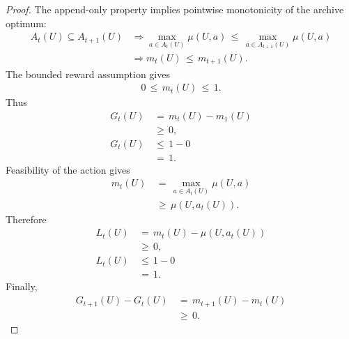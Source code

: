 \documentclass{article} %
\begin{document}
\begin{proof}
The append-only property implies pointwise monotonicity of the archive optimum:
\begin{align}
\label{eq:app-six-proof-m-monotone}
A_t(U)\subseteq A_{t+1}(U)
&\Longrightarrow
\max_{a\in A_t(U)}\mu(U,a)
\,\le\,
\max_{a\in A_{t+1}(U)}\mu(U,a)
\\
&\Longrightarrow
m_t(U)\,\le\, m_{t+1}(U).
\end{align}
The bounded reward assumption gives
\begin{align}
\label{eq:app-six-proof-m-bounded}
0
\,\le\,
m_t(U)
\,\le\,
1.
\end{align}
Thus
\begin{align}
\label{eq:app-six-proof-G-bound}
G_t(U)
&\,=\,
m_t(U)-m_1(U)
\\
&\,\ge\,
0,
\\
G_t(U)
&\,\le\,
1-0
\\
&\,=\,
1.
\end{align}
Feasibility of the action gives
\begin{align}
\label{eq:app-six-proof-L-nonnegative}
m_t(U)
&\,=\,
\max_{a\in A_t(U)}\mu(U,a)
\\
&\,\ge\,
\mu(U,a_t(U)).
\end{align}
Therefore
\begin{align}
\label{eq:app-six-proof-L-bound}
L_t(U)
&\,=\,
m_t(U)-\mu(U,a_t(U))
\\
&\,\ge\,
0,
\\
L_t(U)
&\,\le\,
1-0
\\
&\,=\,
1.
\end{align}
Finally,
\begin{align}
\label{eq:app-six-proof-G-monotone}
G_{t+1}(U)-G_t(U)
&\,=\,
m_{t+1}(U)-m_t(U)
\\
&\,\ge\,
0.
\end{align}
\end{proof}
\end{document}
